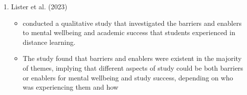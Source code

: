 \documentclass{beamer}
\newcounter{saveenumi}
\newcommand{\conti}{\setcounter{enumi}{\value{saveenumi}}}
\numberwithin{equation}{section}
\numberwithin{table}{section}
\begin{document}
\begin{frame}
	\begin{enumerate}
		\conti
		\item Lister et al. (2023)
		\begin{itemize}
			\item conducted a qualitative study that investigated the barriers and enablers to mental wellbeing and academic success that students experienced in distance learning.
			\item The study found that barriers and enablers were existent in the majority of themes, implying that different aspects of study could be both barriers or enablers for mental wellbeing and study success, depending on who was experiencing them and how
		\end{itemize}
	\end{enumerate}
\end{frame}
\end{document}
